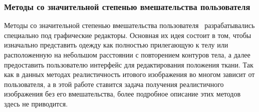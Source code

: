 
\subsubsection{Методы со значительной степенью вмешательства пользователя}

Методы со значительной степенью вмешательства
пользователя~\cite{bib09, bib10} разрабатывались специально под графические редакторы. Основная их идея
состоит в том, чтобы изначально представить одежду как полностью прилегающую к
телу или расположенную на небольшом расстоянии с повторением контуров тела, а
далее предоставить пользователю интерфейс для редактирования положения ткани.
Так как в данных методах реалистичность итового изображения во многом зависит от
пользователя, а в этой работе ставится задача получения реалистичного
изображения без его вмешательства, более подробное описание этих методов здесь
не приводится.

